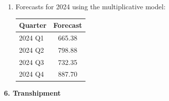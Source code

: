 \documentclass[11pt,a4paper]{article}
\begin{document}
\begin{enumerate}
For the multiplicative model:
\[
|636-626.93|=9.07,\quad |760-753.38|=6.62,\quad |692-691.23|=0.77,\quad |852-838.54|=13.46
\]
so
\[
\text{MAD}_{\text{mult}}=\frac{9.07+6.62+0.77+13.46}{4}\approx 7.48
\]

For the additive model:
\[
|636-634.60|=1.40,\quad |760-750.36|=9.64,\quad |692-697.13|=5.13,\quad |852-824.52|=27.48
\]
so
\[
\text{MAD}_{\text{add}}=\frac{1.40+9.64+5.13+27.48}{4}\approx 10.91
\]
The multiplicative model is better.

\item Forecasts for 2024 using the multiplicative model:

\begin{center}
\begin{tabular}{lc}
\toprule
Quarter & Forecast \\
\midrule
2024 Q1 & 665.38 \\
2024 Q2 & 798.88 \\
2024 Q3 & 732.35 \\
2024 Q4 & 887.70 \\
\bottomrule
\end{tabular}
\end{center}
\end{enumerate}

\textbf{6. Transhipment}
\end{document}
